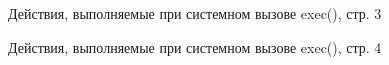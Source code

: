 \documentclass[a4paper,oneside,14pt]{extreport}
\begin{document}
\begin{figure}[h]
	\caption{Действия, выполняемые при системном вызове exec(), стр. 3}
	\label{exec3}
\end{figure}

\begin{figure}[h]
	\caption{Действия, выполняемые при системном вызове exec(), стр. 4}
	\label{exec4}
\end{figure}
\end{document}
